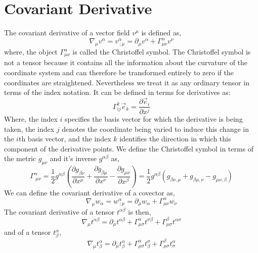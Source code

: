 \section{Covariant Derivative}
The covariant derivative of a vector field $v^{\mu}$ is defined as,
\begin{equation}
\nabla_{\mu} v^{\alpha} = v^{\alpha}_{ \  ; \mu} = \partial_{\mu} v^{\alpha} + \Gamma^{\alpha}_{\mu \nu} v^{\nu}
\end{equation}
where, the object $\Gamma^{\alpha}_{\mu \nu}$ is called the Christoffel symbol. The Christoffel symbol is not a tensor because it contains all the information about the curvature of the coordinate system and can therefore be transformed entirely to zero if the coordinates are straightened. Nevertheless we treat it as any ordinary tensor in terms of the index notation. It can be defined in terms for derivatives as:
\begin{equation}
\Gamma^{k}_{ij}\vec{e}_{k} = \frac{\partial \vec{e}_{i}}{\partial x^{j}}
\end{equation}
Where, the index $i$ specifies the basis vector for which the derivative is being
taken, the index $j$ denotes the coordinate being varied to induce this change
in the $i$th basis vector, and the index $k$ identifies the direction in which this
component of the derivative points. We define the Christoffel symbol in terms of the metric $g_{\mu \nu}$ and it's inverse $g^{\alpha \beta}$ as,
\begin{equation}
\Gamma^{\alpha}_{\ \mu \nu} = \frac{1}{2} g^{\alpha \beta} \left(\frac{\partial g_{\beta \nu}}{\partial x^{\mu}} + \frac{\partial g_{\beta \mu}}{\partial x^{\nu}} - \frac{\partial g_{\mu \nu}}{\partial x^{\beta}}\right) = \frac{1}{2}g^{\alpha \beta} \left(g_{\beta \nu, \mu} + g_{\beta \mu, \nu} - g_{\mu \nu, \beta}\right)
\end{equation}
We can define the covariant derivative of a covector as,
\begin{equation}
\nabla_{\mu} w_{\alpha} = w^{\alpha}_{ \  ; \mu} = \partial_{\mu} w_{\alpha} + \Gamma^{\alpha}_{\mu \nu} w_{\nu}
\end{equation}
The covariant derivative of a tensor $t^{\alpha\beta}$ is then,
\begin{equation}
\nabla_{\mu}t^{\alpha \beta} = \partial_{\mu} t^{\alpha \beta} + \Gamma^{\alpha}_{\mu \sigma}t^{\sigma \beta} + \Gamma^{\beta}_{\mu \sigma}t^{\alpha \sigma }
\end{equation}
and of a tensor $t^{\alpha}_{\beta}$,
\begin{equation}
\nabla_{\mu}t^{\alpha}_{\beta} = \partial_{\mu} t^{\alpha}_{\beta} + \Gamma^{\alpha}_{\mu \sigma}t^{\sigma}_{\beta} + \Gamma^{\beta}_{\mu \sigma}t^{\alpha}_{\sigma}
\end{equation}

